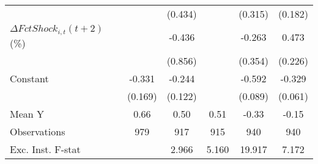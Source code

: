 {\begin{tabular}{l*{5}{c}}
                    &                     &     (0.434)         &                     &     (0.315)         &     (0.182)         \\
\addlinespace
$ \Delta FctShock_{i,t}(t+2)$ (\%)&                     &      -0.436         &                     &      -0.263         &       0.473\sym{**} \\
                    &                     &     (0.856)         &                     &     (0.354)         &     (0.226)         \\
\addlinespace
Constant            &      -0.331\sym{*}  &      -0.244\sym{*}  &                     &      -0.592\sym{***}&      -0.329\sym{***}\\
                    &     (0.169)         &     (0.122)         &                     &     (0.089)         &     (0.061)         \\
\midrule
Mean Y              &        0.66         &        0.50         &        0.51         &       -0.33         &       -0.15         \\
Observations        &         979         &         917         &         915         &         940         &         940         \\
Exc. Inst. F-stat   &                     &       2.966         &       5.160         &      19.917         &       7.172         \\
\bottomrule
\end{tabular}
}

